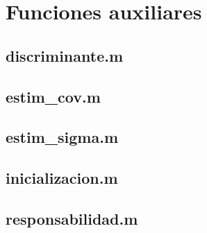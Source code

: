 \documentclass[10pt,a4paper]{article}
\begin{document}
		
	\setcounter{page}{1}

	

	\pagebreak
	\appendix
		\section{Funciones auxiliares}
			\subsection{discriminante.m}
				
			\subsection{estim\_cov.m}
				
			\subsection{estim\_sigma.m}
				
			\subsection{inicializacion.m}
				
			\subsection{responsabilidad.m}
				
\end{document}
